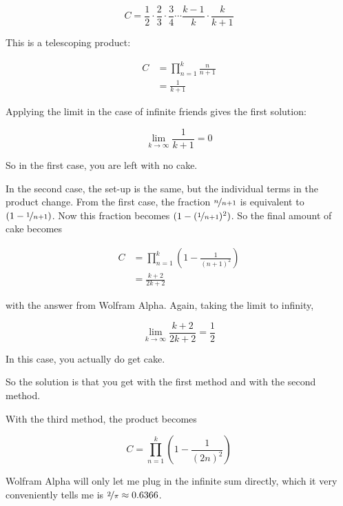 \documentclass{article}
\begin{document}
\[
C=\frac{1}{2}\cdot\frac{2}{3}\cdot\frac{3}{4}\cdots\frac{k-1}{k}\cdot\frac{k}{k+1}
\]

This is a telescoping product:

\begin{align*}
C &=\prod_{n=1}^{k}\frac{n}{n+1} \\
  &=\frac{1}{k+1}
\end{align*}

Applying the limit in the case of infinite friends gives the first solution:

\[
\lim_{k\rightarrow\infty}\frac{1}{k+1}=0
\]

So in the first case, you are left with no cake.

In the second case, the set-up is the same, but the individual terms in the product change.
From the first case, the fraction $\nicefrac{n}{n+1}$ is equivalent to $(1-\nicefrac{1}{n+1})$.
Now this fraction becomes $(1-(\nicefrac{1}{n+1})^{2})$.
So the final amount of cake becomes

\begin{align*}
C &=\prod_{n=1}^{k}\left(1-\frac{1}{(n+1)^{2}}\right) \\
  &=\frac{k+2}{2k+2}
\end{align*}

with the answer from Wolfram Alpha.
Again, taking the limit to infinity,

\[
\lim_{k\rightarrow\infty}\frac{k+2}{2k+2}=\frac{1}{2}
\]

In this case, you actually do get cake.

So the solution is that you get
 with the first method and
 with the second method.

With the third method, the product becomes

\[
C=\prod_{n=1}^{k}\left(1-\frac{1}{(2n)^{2}}\right)
\]

Wolfram Alpha will only let me plug in the infinite sum directly, which it very conveniently tells me is $\nicefrac{2}{\pi}\approx0.6366$.
\end{document}
